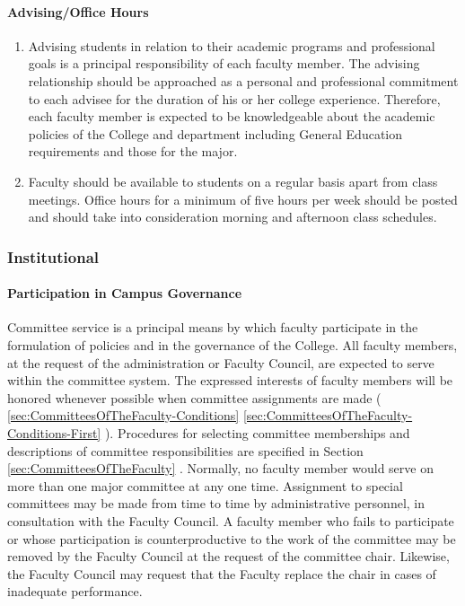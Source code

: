 			\paragraph{Advising/Office Hours}
				\begin{enumerate}[label=\alph*)]
					\item{Advising students in relation to their academic programs and professional goals is a principal responsibility of each faculty member.  The advising relationship should be approached as a personal and professional commitment to each advisee for the duration of his or her college experience.  Therefore, each faculty member is expected to be knowledgeable about the academic policies of the College and department including General Education requirements and those for the major.}
					\item{Faculty should be available to students on a regular basis apart from class meetings. Office hours for a minimum of five hours per week should be posted and should take into consideration morning and afternoon class schedules.}
				\end{enumerate}
		\subsubsection{Institutional}
			\paragraph{Participation in Campus Governance}
				\label{sec:ParticipationInCampusGovernance}
				Committee service is a principal means by which faculty participate in the formulation of policies and in the governance of the College.  All faculty members, at the request of the administration or Faculty Council, are expected to serve within the committee system.  The expressed interests of faculty members will be honored whenever possible when committee assignments are made (
				\ref{sec:CommitteesOfTheFaculty-Conditions}
				\ref{sec:CommitteesOfTheFaculty-Conditions-First}
				).  Procedures for selecting committee memberships and descriptions of committee responsibilities are specified in
				Section
				\ref{sec:CommitteesOfTheFaculty}
				.  Normally, no faculty member would serve on more than one major committee at any one time.  Assignment to special committees may be made from time to time by administrative personnel, in consultation with the Faculty Council.  A faculty member who fails to participate or whose participation is counterproductive to the work of the committee may be removed by the Faculty Council at the request of the committee chair.  Likewise, the Faculty Council may request that the Faculty replace the chair in cases of inadequate performance.
